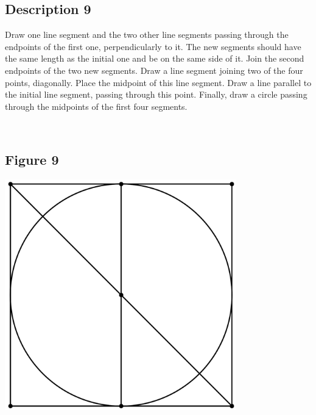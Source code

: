 \documentclass[12pt,a4paper,article,english,firamath]{nsi}
\begin{document}
\maketitle

\subsection*{Description 9}
{\brettley 

Draw one line segment and the two other line segments passing through the endpoints of the first one, perpendicularly to it. The new segments should have the same length as the initial one and be on the same side of it. Join the second endpoints of the two new segments. Draw a line segment joining two of the four points, diagonally. Place the midpoint of this line segment. Draw a line parallel to the initial line segment, passing through this point. Finally, draw a circle passing through the midpoints of the first four segments.}\\[1em]



\subsection*{Figure 9}
\begin{center}
    \includegraphics[height=10cm]{img/fig09.png}
\end{center}
\end{document}

